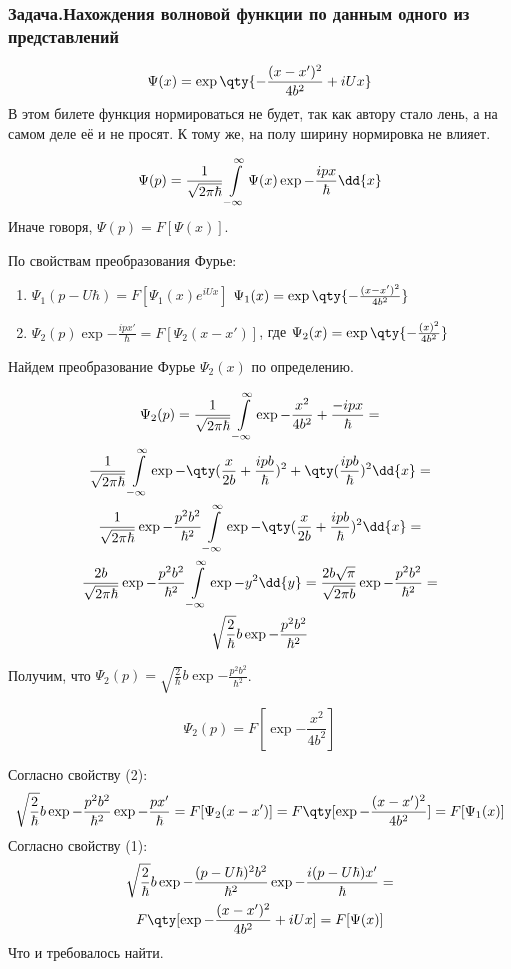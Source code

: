 \subsubsection{Задача.Нахождения волновой функции по данным одного из представлений}

$$\Psi(x)=\exp \qty{-\frac{(x-x')^2}{4b^2}+iUx} $$
В этом билете функция нормироваться не будет, так как автору стало лень, а на самом деле её и не просят. К тому же, на полу ширину нормировка не влияет.

$$\Psi(p)=\frac{1}{\sqrt{2\pi\hbar} } \infint \Psi(x) \exp{-\frac{ipx}{\hbar}}\dd{x} $$
Иначе говоря, $\Psi(p)=F[\Psi(x)]$.

По свойствам преобразования Фурье:  
\begin{enumerate}
	\item $\Psi_1(p-U\hbar)= F[\Psi_1(x)e^{iUx}]$ $\Psi_1(x)=\exp \qty{-\frac{(x-x')^2}{4b^2}}$
	\item $\Psi_2(p)\exp{-\frac{ipx'}{\hbar}}=F[\Psi_2(x-x')]$, где 
	$\Psi_2(x)=\exp \qty{-\frac{(x)^2}{4b^2}}$
\end{enumerate}

Найдем преобразование Фурье $\Psi_2(x)$ по определению.

\begin{gather*}
\Psi_2(p)=\frac{1}{\sqrt{2\pi\hbar}}\infint \exp{-\frac{x^2}{4b^2}+\frac{-ipx}{\hbar}}=\\
\frac{1}{\sqrt{2\pi\hbar}}\infint \exp{-\qty(\frac{x}{2b}+\frac{ipb}{\hbar})^2+
\qty(\frac{ipb}{\hbar})^2}\dd{x}= \\
\frac{1}{\sqrt{2\pi\hbar}}\exp{-\frac{p^2b^2}{\hbar^2}} 
\infint \exp{-\qty(\frac{x}{2b}+\frac{ipb}{\hbar})^2} \dd{x}=\\
\frac{2b}{\sqrt{2\pi\hbar}}\exp{-\frac{p^2b^2}{\hbar^2}} 
\infint \exp{-y^2}\dd{y}=\frac{2b\sqrt\pi}{\sqrt{2\pi b}}\exp{-\frac{p^2b^2}{\hbar^2}}=\\ 
\sqrt{\frac{2}{\hbar}}b\exp{-\frac{p^2b^2}{\hbar^2}}
\end{gather*}

Получим, что $\Psi_2(p)=\sqrt{\frac{2}{\hbar}}b\exp{-\frac{p^2b^2}{\hbar^2}}$.

$$\Psi_2(p)=F[\exp{-\frac{x^2}{4b^2}}]$$

Согласно свойству (2):
$$\sqrt{\frac{2}{\hbar}}b\exp{-\frac{p^2b^2}{\hbar^2}}\exp{-\frac{px'}{\hbar}}=
F[\Psi_2(x-x')]=F\qty[ \exp{-\frac{(x-x')^2}{4b^2}} ] = F[\Psi_1(x)]$$
Согласно свойству (1):
\begin{gather*}
\sqrt{\frac{2}{\hbar}}b\exp{-\frac{(p-U\hbar)^2b^2}{\hbar^2}}\exp{-\frac{i(p-U\hbar)x'}{\hbar}}=\\
 F\qty[\exp{-\frac{(x-x')^2}{4b^2}}+iUx]=F[\Psi(x)]
\end{gather*}
Что и требовалось найти.

